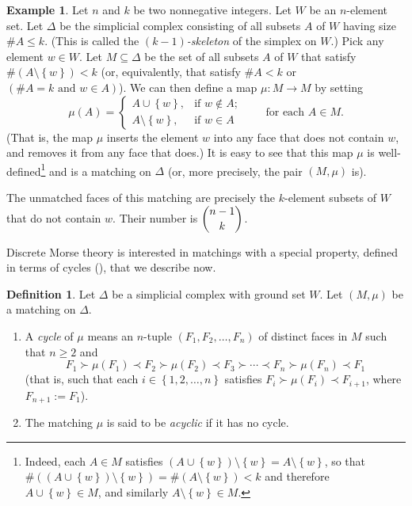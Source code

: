 \documentclass[12pt]{amsart}
\theoremstyle{definition}
\newtheorem{definition}[theorem]{Definition}
\newtheorem{example}[theorem]{Example}
\begin{document}
\begin{example}
\label{exa.parmat.1}Let $n$ and $k$ be two nonnegative integers. Let $W$ be an
$n$-element set. Let $\Delta$ be the simplicial complex consisting of all
subsets $A$ of $W$ having size $\#A\leq k$. (This is called the $\left(
k-1\right)  $\emph{-skeleton} of the simplex on $W$.) Pick any element $w\in
W$. Let $M\subseteq\Delta$ be the set of all subsets $A$ of $W$ that satisfy
$\#\left(  A\setminus\left\{  w\right\}  \right)  <k$ (or, equivalently, that
satisfy $\#A<k$ or $\left(  \#A=k\text{ and }w\in A\right)  $). We can then
define a map $\mu:M\rightarrow M$ by setting%
\[
\mu\left(  A\right)  =%
\begin{cases}
A\cup\left\{  w\right\}  , & \text{if }w\notin A;\\
A\setminus\left\{  w\right\}  , & \text{if }w\in A
\end{cases}
\qquad\text{for each }A\in M.
\]
(That is, the map $\mu$ inserts the element $w$ into any face that does not
contain $w$, and removes it from any face that does.) It is easy to see that
this map $\mu$ is well-defined\footnote{Indeed, each $A\in M$ satisfies
$\left(  A\cup\left\{  w\right\}  \right)  \setminus\left\{  w\right\}
=A\setminus\left\{  w\right\}  $, so that $\#\left(  \left(  A\cup\left\{
w\right\}  \right)  \setminus\left\{  w\right\}  \right)  =\#\left(
A\setminus\left\{  w\right\}  \right)  <k$ and therefore $A\cup\left\{
w\right\}  \in M$, and similarly $A\setminus\left\{  w\right\}  \in M$.} and
is a matching on $\Delta$ (or, more precisely, the pair $\left(  M,\mu\right)
$ is).

The unmatched faces of this matching are precisely the $k$-element subsets of
$W$ that do not contain $w$. Their number is $\dbinom{n-1}{k}$.
\end{example}

Discrete Morse theory is interested in matchings with a special property,
defined in terms of cycles (\cite[Definition 10.7]{Kozlov20}),
that we describe now.

\begin{definition}
Let $\Delta$ be a simplicial complex with ground set $W$. Let $\left(
M,\mu\right)  $ be a matching on $\Delta$.

\begin{enumerate}
\item[(a)] A \emph{cycle} of $\mu$ means an $n$-tuple $\left(  F_{1}%
,F_{2},\ldots,F_{n}\right)  $ of distinct faces in $M$ such that $n\geq2$ and%
\[
F_{1}\succ\mu\left(  F_{1}\right)  \prec F_{2}\succ\mu\left(  F_{2}\right)
\prec F_{3}\succ\cdots\prec F_{n}\succ\mu\left(  F_{n}\right)  \prec F_{1}%
\]
(that is, such that each $i\in\left\{  1,2,\ldots,n\right\}  $ satisfies
$F_{i}\succ\mu\left(  F_{i}\right)  \prec F_{i+1}$, where $F_{n+1}:=F_{1}$).

\item[(b)] The matching $\mu$ is said to be \emph{acyclic} if it has no cycle.
\end{enumerate}
\end{definition}
\end{document}
